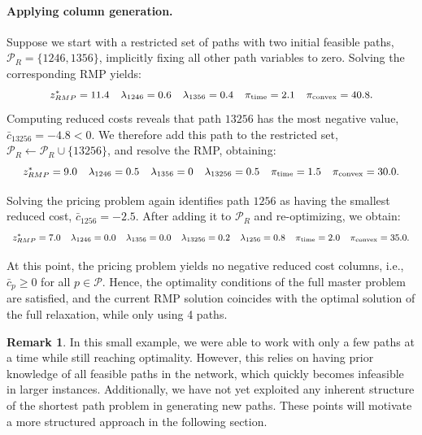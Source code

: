 \documentclass{book}
\theoremstyle{definition}
\newtheorem{remark}[theorem]{Remark}
\numberwithin{algorithm_}{chapter}
\begin{document}
\paragraph{Applying column generation.}  
Suppose we start with a restricted set of paths with two initial feasible paths, $\mathcal{P}_R = \{1246, 1356\}$, implicitly fixing all other path variables to zero.  
Solving the corresponding RMP yields:
\[
\small
\begin{array}{llllll}
z_{RMP}^* = 11.4 & \lambda_{1246} = 0.6 & \lambda_{1356} = 0.4 & \pi_\text{time} = 2.1 & \pi_\text{convex} = 40.8.
\end{array}
\]
Computing reduced costs reveals that path $13256$ has the most negative value, $\bar{c}_{13256} = -4.8 < 0$.  
We therefore add this path to the restricted set, $\mathcal{P}_R \gets \mathcal{P}_R \cup \{13256\}$, and resolve the RMP, obtaining:
\[
\small
\begin{array}{llllll}
z_{RMP}^* = 9.0 & \lambda_{1246} = 0.5 & \lambda_{1356} = 0 & \lambda_{13256} = 0.5 & \pi_\text{time} = 1.5 & \pi_\text{convex} = 30.0.
\end{array}
\]

Solving the pricing problem again identifies path $1256$ as having the smallest reduced cost, $\bar{c}_{1256} = -2.5$.  
After adding it to $\mathcal{P}_R$ and re-optimizing, we obtain:
\[
\small
\begin{array}{lllllll}
z_{RMP}^* = 7.0 & \lambda_{1246} = 0.0 & \lambda_{1356} = 0.0 & \lambda_{13256} = 0.2 & \lambda_{1256} = 0.8 & \pi_\text{time} = 2.0 & \pi_\text{convex} = 35.0.
\end{array}
\]

At this point, the pricing problem yields no negative reduced cost columns, i.e., $\bar{c}_p \ge 0$ for all $p \in \mathcal{P}$.  
Hence, the optimality conditions of the full master problem are satisfied, and the current RMP solution coincides with the optimal solution of the full relaxation, while only using 4 paths.

\begin{remark}
In this small example, we were able to work with only a few paths at a time while still reaching optimality. However, this relies on having prior knowledge of all feasible paths in the network, which quickly becomes infeasible in larger instances. Additionally, we have not yet exploited any inherent structure of the shortest path problem in generating new paths. These points will motivate a more structured approach in the following section.
\end{remark}
\end{document}
